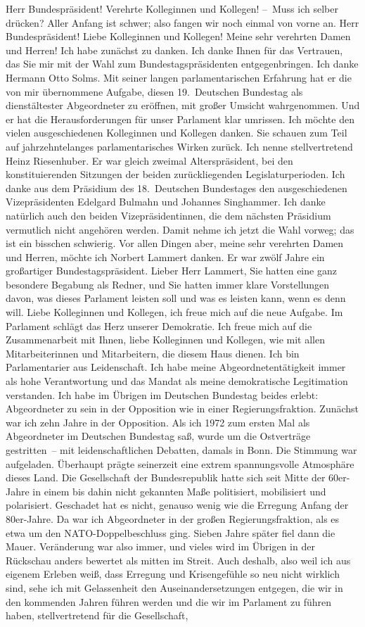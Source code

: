\documentclass[10pt, a4paper]{report}
\begin{document}
Herr Bundespräsident! Verehrte Kolleginnen und Kollegen! – Muss ich selber drücken? Aller Anfang ist schwer; also fangen wir noch einmal von vorne an. Herr Bundespräsident! Liebe Kolleginnen und Kollegen! Meine sehr verehrten Damen und Herren! Ich habe zunächst zu danken. Ich danke Ihnen für das Vertrauen, das Sie mir mit der Wahl zum Bundestagspräsidenten entgegenbringen. Ich danke Hermann Otto Solms. Mit seiner langen parlamentarischen Erfahrung hat er die von mir übernommene Aufgabe, diesen 19. Deutschen Bundestag als dienstältester Abgeordneter zu eröffnen, mit großer Umsicht wahrgenommen. Und er hat die Herausforderungen für unser Parlament klar umrissen. Ich möchte den vielen ausgeschiedenen Kolleginnen und Kollegen danken. Sie schauen zum Teil auf jahrzehntelanges parlamentarisches Wirken zurück. Ich nenne stellvertretend Heinz Riesenhuber. Er war gleich zweimal Alterspräsident, bei den konstituierenden Sitzungen der beiden zurückliegenden Legislaturperioden. Ich danke aus dem Präsidium des 18. Deutschen Bundestages den ausgeschiedenen Vizepräsidenten Edelgard Bulmahn und Johannes Singhammer. Ich danke natürlich auch den beiden Vizepräsidentinnen, die dem nächsten Präsidium vermutlich nicht angehören werden. Damit nehme ich jetzt die Wahl vorweg; das ist ein bisschen schwierig. Vor allen Dingen aber, meine sehr verehrten Damen und Herren, möchte ich Norbert Lammert danken. Er war zwölf Jahre ein großartiger Bundestagspräsident. Lieber Herr Lammert, Sie hatten eine ganz besondere Begabung als Redner, und Sie hatten immer klare Vorstellungen davon, was dieses Parlament leisten soll und was es leisten kann, wenn es denn will. Liebe Kolleginnen und Kollegen, ich freue mich auf die neue Aufgabe. Im Parlament schlägt das Herz unserer Demokratie. Ich freue mich auf die Zusammenarbeit mit Ihnen, liebe Kolleginnen und Kollegen, wie mit allen Mitarbeiterinnen und Mitarbeitern, die diesem Haus dienen. Ich bin Parlamentarier aus Leidenschaft. Ich habe meine Abgeordnetentätigkeit immer als hohe Verantwortung und das Mandat als meine demokratische Legitimation verstanden. Ich habe im Übrigen im Deutschen Bundestag beides erlebt: Abgeordneter zu sein in der Opposition wie in einer Regierungsfraktion. Zunächst war ich zehn Jahre in der Opposition. Als ich 1972 zum ersten Mal als Abgeordneter im Deutschen Bundestag saß, wurde um die Ostverträge gestritten – mit leidenschaftlichen Debatten, damals in Bonn. Die Stimmung war aufgeladen. Überhaupt prägte seinerzeit eine extrem spannungsvolle Atmosphäre dieses Land. Die Gesellschaft der Bundesrepublik hatte sich seit Mitte der 60er-Jahre in einem bis dahin nicht gekannten Maße politisiert, mobilisiert und polarisiert. Geschadet hat es nicht, genauso wenig wie die Erregung Anfang der 80er-Jahre. Da war ich Abgeordneter in der großen Regierungsfraktion, als es etwa um den NATO-Doppelbeschluss ging. Sieben Jahre später fiel dann die Mauer. Veränderung war also immer, und vieles wird im Übrigen in der Rückschau anders bewertet als mitten im Streit. Auch deshalb, also weil ich aus eigenem Erleben weiß, dass Erregung und Krisengefühle so neu nicht wirklich sind, sehe ich mit Gelassenheit den Auseinandersetzungen entgegen, die wir in den kommenden Jahren führen werden und die wir im Parlament zu führen haben, stellvertretend für die Gesellschaft, 
\end{document}
